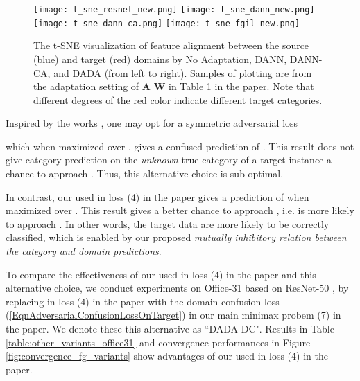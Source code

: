\documentclass[letterpaper]{article} \usepackage{aaai20}  \usepackage{times}  \usepackage{helvet} \usepackage{courier}  \usepackage[hyphens]{url}  \usepackage{graphicx} \urlstyle{rm} \def\UrlFont{\rm}  \usepackage{graphicx}  \frenchspacing  \setlength{\pdfpagewidth}{8.5in}  \setlength{\pdfpageheight}{11in}
\begin{document}
\begin{figure*}[ht]
	\texttt{[image: t\_sne\_resnet\_new.png]} \hfill  \texttt{[image: t\_sne\_dann\_new.png]} \hfill \texttt{[image: t\_sne\_dann\_ca.png]} \hfill  \texttt{[image: t\_sne\_fgil\_new.png]} \\
	\caption{ The t-SNE visualization of feature alignment between the source (blue) and target (red) domains by No Adaptation, DANN, DANN-CA, and DADA (from left to right). Samples of plotting are from the adaptation setting of \textbf{A}  \textbf{W} in Table 1 in the paper. Note that different degrees of the red color indicate different target categories.}  
	\label{fig:t_sne}  
\end{figure*}

Inspired by the works \cite{simultaneous_transfer,symnets}, one may opt for a symmetric adversarial loss

which when maximized over , gives a confused prediction of . This result does not give category prediction  on the \emph{unknown} true category  of a target instance  a chance to approach . Thus, this alternative choice is sub-optimal. 

In contrast, our used  in loss (4) in the paper gives a prediction of  when maximized over . This result gives  a better chance to approach , i.e.  is more likely to approach . In other words, the target data are more likely to be correctly classified, which is enabled by our proposed \emph{mutually inhibitory relation between the category and domain predictions}. 

To compare the effectiveness of our used  in loss (4) in the paper and this alternative choice, we conduct experiments on Office-31 \cite{office31} based on ResNet-50 \cite{resnet}, by replacing  in loss (4) in the paper with the domain confusion loss (\ref{EqnAdversarialConfusionLossOnTarget}) in our main minimax probem (7) in the paper. 
We denote these this alternative as ``DADA-DC". Results in Table \ref{table:other_variants_office31} and convergence performances in Figure \ref{fig:convergence_fg_variants} show advantages of our used  in loss (4) in the paper.
\end{document}
